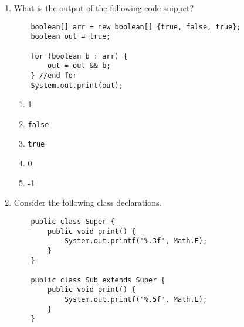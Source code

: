 \documentclass[S17-Final.tex]{subfiles}
\begin{document}
\begin{enumerate}
\item What is the output of the following code snippet?
\begin{lstlisting}
    boolean[] arr = new boolean[] {true, false, true};
    boolean out = true;
    
    for (boolean b : arr) {
        out = out && b;
    } //end for
    System.out.print(out);
\end{lstlisting}
	
\begin{enumerate}
\item  1
\item  \texttt{false}
\item  \texttt{true}
\item  0
\item  -1
\end{enumerate}

	
\clearpage
\item Consider the following class declarations.
\begin{lstlisting}
    public class Super {
        public void print() {
            System.out.printf("%.3f", Math.E);
        }
    }

    public class Sub extends Super {
        public void print() {
            System.out.printf("%.5f", Math.E);
        }
    }
    

\end{lstlisting}
\end{enumerate}
\end{document}
